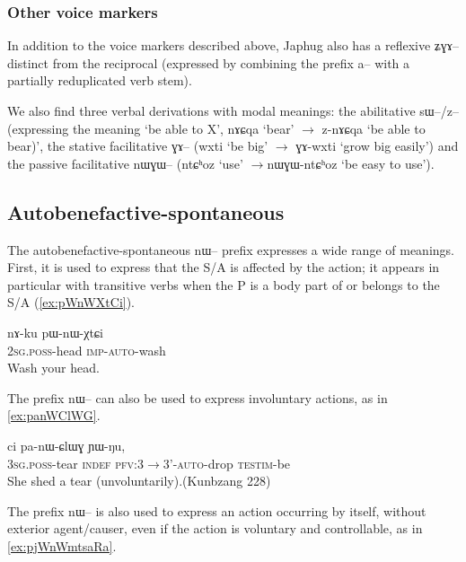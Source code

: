 \documentclass[oldfontcommands,oneside,a4paper,11pt]{article}
\newcommand{\ipa}[1]{{\phon #1}} %
\begin{document}
\subsubsection{Other voice markers}
In addition to the voice markers described above, Japhug also has a reflexive \ipa{ʑɣɤ--} distinct from the reciprocal (expressed by combining the prefix \ipa{a--} with a partially reduplicated verb stem).

We also find three verbal derivations with modal meanings: the abilitative \ipa{sɯ--/z--} (expressing the meaning `be able to X', \ipa{nɤɕqa} `bear' $\rightarrow$ \ipa{z-nɤɕqa} `be able to bear)', the stative facilitative \ipa{ɣɤ--} (\ipa{wxti} `be big' $\rightarrow$ \ipa{ɣɤ-wxti} `grow big easily') and the passive facilitative \ipa{nɯɣɯ--} (\ipa{ntɕʰoz} `use' $\rightarrow$\ipa{nɯɣɯ-ntɕʰoz} `be easy to use').
   
\subsection{Autobenefactive-spontaneous}

The autobenefactive-spontaneous \ipa{nɯ--} prefix expresses a wide range of meanings. First, it is used to express that the S/A is affected by the action; it appears in particular with transitive verbs when the P is a body part of or belongs to the S/A (\ref{ex:pWnWXtCi}).

\begin{exe}
\ex \label{ex:pWnWXtCi}
\gll 
\ipa{nɤ-ku} 	\ipa{pɯ-nɯ-χtɕi} \\
\textsc{2sg.poss}-head \textsc{imp-auto}-wash \\
\glt Wash your head.
\end{exe}

The prefix \ipa{nɯ--} can also be used to express involuntary actions, as in \ref{ex:panWClWG}.

\begin{exe}
\ex \label{ex:panWClWG}
\gll \ipa{ɯ-qom} 	\ipa{ci} 	\ipa{pa-nɯ-ɕlɯɣ} 	\ipa{ɲɯ-ŋu,} \\
\textsc{3sg.poss}-tear \textsc{indef} \textsc{pfv:3$\rightarrow$3'-auto}-drop \textsc{testim}-be \\
\glt She shed a tear (unvoluntarily).(Kunbzang 228)
\end{exe}


The prefix \ipa{nɯ--} is also used to express an action occurring by itself, without exterior agent/causer, even if the action is voluntary and controllable, as in \ref{ex:pjWnWmtsaRa}.
\end{document}
